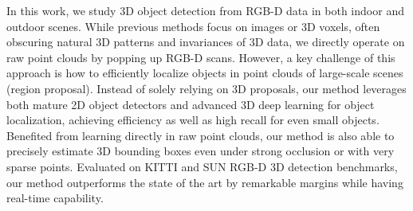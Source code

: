 


In this work, we study 3D object detection from RGB-D data in both indoor and outdoor scenes. While previous methods focus on images or 3D voxels, often obscuring natural 3D patterns and invariances of 3D data, we directly operate on raw point clouds by popping up RGB-D scans. However, a key challenge of this approach is how to efficiently localize objects in point clouds of large-scale scenes (region proposal). Instead of solely relying on 3D proposals, our method leverages both mature 2D object detectors and advanced 3D deep learning for object localization, achieving efficiency as well as high recall for even small objects. Benefited from learning directly in raw point clouds, our method is also able to precisely estimate 3D bounding boxes even under strong occlusion or with very sparse points. Evaluated on KITTI and SUN RGB-D 3D detection benchmarks, our method outperforms the state of the art by remarkable margins while having real-time capability.
